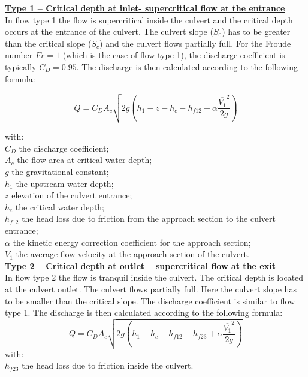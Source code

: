 \underline{\textbf{Type 1 -- Critical depth at inlet- supercritical flow at the entrance}}\\

In flow type 1 the flow is supercritical inside the culvert and the critical depth occurs
at the entrance of the culvert. The culvert slope ($S_0$) has to be greater than the
critical slope ($S_c$) and the culvert flows partially full.
For the Froude number $Fr=1$ (which is the case of flow type 1),
the discharge coefficient is typically $C_D=0.95$.
The discharge is then calculated according to the following formula:

\begin{equation}
Q = C_D A_c \sqrt{2g\left(h_1-z-h_c-h_{f12}+\alpha \dfrac{\overline{V_1}^2}{2g}\right)}
\end{equation}

with:\\
$C_D$ the discharge coefficient;\\
$A_c$ the flow area at critical water depth; \\
$g$ the gravitational constant; \\
$h_1$ the upstream water depth; \\
$z$ elevation of the culvert entrance; \\
$h_c$ the critical water depth; \\
$h_{f12}$ the head loss due to friction from the approach section to the culvert entrance; \\
$\alpha$ the kinetic energy correction coefficient for the approach section; \\
$V_1$ the average flow velocity at the approach section of the culvert.\\

\underline{\textbf{Type 2 -- Critical depth at outlet – supercritical flow at the exit}}\\

In flow type 2 the flow is tranquil inside the culvert. The critical depth is located at
the culvert outlet. The culvert flows partially full. Here the culvert slope has to be
smaller than the critical slope. The discharge coefficient is similar to flow type 1.
The discharge is then calculated according to the following formula:
\begin{equation}
Q=C_D A_c \sqrt{2g\left(h_1-h_c-h_{f12}-h_{f23}+\alpha \dfrac{\overline{V_1}^2}{2g}\right)}
\end{equation}
with:\\
$h_{f23}$ the head loss due to friction inside the culvert.\\

